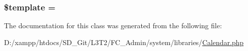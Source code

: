 \subsubsection[{\$template}]{\setlength{\rightskip}{0pt plus 5cm}\$template = \textquotesingle{}\textquotesingle{}}\label{class_c_i___calendar_aa3e9534005fd516d941f6a5569896e01}


The documentation for this class was generated from the following file\+:\begin{DoxyCompactItemize}
\item 
D\+:/xampp/htdocs/\+S\+D\+\_\+\+Git/\+L3\+T2/\+F\+C\+\_\+\+Admin/system/libraries/\hyperlink{_calendar_8php}{Calendar.\+php}\end{DoxyCompactItemize}
